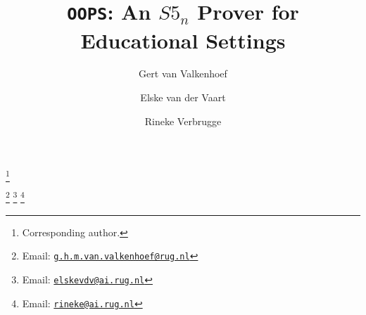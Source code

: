 \documentclass{entcs}
\newcommand{\email}[1]{Email: \href{mailto:#1} {\texttt{\normalshape #1}}}
\newcommand{\oops}{\texttt{OOPS}}
\begin{document}
\begin{frontmatter}
\title{\oops: An $S5_n$ Prover for Educational Settings}

\author{Gert van Valkenhoef}
\address{Department of Business and ICT, University of Groningen,\\
P.O. Box 800, 9700 AV, Groningen, The Netherlands}
\author{Elske van der Vaart}
\address{Department of Artificial Intelligence, University of Groningen,\\
P.O. Box 407, 9700 AK, Groningen, The Netherlands}
\address{Theoretical Biology Group, University of Groningen,\\
P.O. Box 14, 9750 AA, Haren, The Netherlands}
\author{Rineke Verbrugge}
\address{Department of Artificial Intelligence, University of Groningen,\\
P.O. Box 407, 9700 AK, Groningen, The Netherlands}

\thanks[cor]{Corresponding author.}

\thanks[gert]{\email{g.h.m.van.valkenhoef@rug.nl}}
\thanks[elske]{\email{elskevdv@ai.rug.nl}}
\thanks[rineke]{\email{rineke@ai.rug.nl}}



\end{frontmatter}












\end{document}

